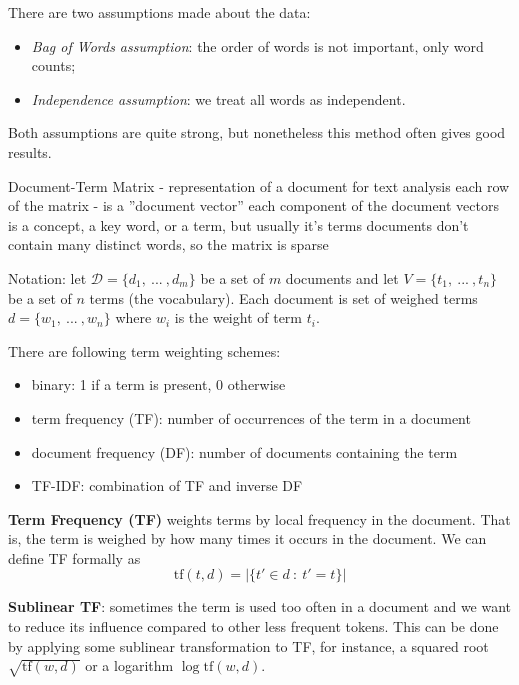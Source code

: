 There are two assumptions made about the data:

\begin{itemize}
\itemsep1pt\parskip0pt
  \item \emph{Bag of Words assumption}: the order of words is not important,
     only word counts;
  \item \emph{Independence assumption}: we treat all words as independent.
\end{itemize}


Both assumptions are quite strong, but nonetheless this method often
gives good results.


Document-Term Matrix - representation of a document for text analysis
each row of the matrix - is a ''document vector''
each component of the document vectors is a concept, a key word, or a term, but usually it's terms
documents don't contain many distinct words, so the matrix is sparse


Notation:
let $\mathcal D = \{d_1, \ ... \ , d_m \}$ be a set of $m$ documents
and let $V = \{t_1, \ ... \ , t_n \}$ be a set of $n$ terms (the vocabulary).
Each document is set of weighed terms $d = \{ w_1, \ ... \ , w_n \}$
where $w_i$ is the weight of term $t_i$.

There are following term weighting schemes:

\begin{itemize}
\itemsep1pt\parskip0pt
  \item binary: 1 if a term is present, 0 otherwise
  \item term frequency (TF): number of occurrences of the term in a document
  \item document frequency (DF): number of documents containing the term
  \item TF-IDF: combination of TF and inverse DF
\end{itemize}


\textbf{Term Frequency (TF)} weights terms by local frequency in the document.
That is, the term is weighed by how many times it occurs in the document.
We can define TF formally as
$$\text{tf}(t, d) = \big| \{ t' \in d  \ : \ t' = t \} \big|$$


\textbf{Sublinear TF}: sometimes the term is used too often in
a document and we want to reduce its influence compared to
other less frequent tokens. This can be done by applying
some sublinear transformation to TF, for instance, a squared root
$\sqrt{\text{tf}(w, d)}$ or a logarithm $\log \text{tf}(w, d)$.


